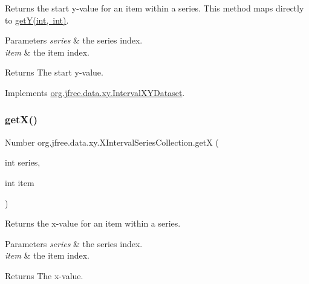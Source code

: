 Returns the start y-\/value for an item within a series. This method maps directly to \mbox{\hyperlink{classorg_1_1jfree_1_1data_1_1xy_1_1_x_interval_series_collection_ae156ad8d79e2278653592a74680ce835}{get\+Y(int, int)}}.


\begin{DoxyParams}{Parameters}
{\em series} & the series index. \\
\hline
{\em item} & the item index.\\
\hline
\end{DoxyParams}
\begin{DoxyReturn}{Returns}
The start y-\/value. 
\end{DoxyReturn}


Implements \mbox{\hyperlink{interfaceorg_1_1jfree_1_1data_1_1xy_1_1_interval_x_y_dataset_afdd414735adb233734bc35b76a005ed9}{org.\+jfree.\+data.\+xy.\+Interval\+X\+Y\+Dataset}}.

\mbox{\label{classorg_1_1jfree_1_1data_1_1xy_1_1_x_interval_series_collection_a2af637ee9454c9b23c9c61e6716eb01d}} 
\subsubsection{\texorpdfstring{get\+X()}{getX()}}
{\footnotesize\ttfamily Number org.\+jfree.\+data.\+xy.\+X\+Interval\+Series\+Collection.\+getX (\begin{DoxyParamCaption}\item[{int}]{series,  }\item[{int}]{item }\end{DoxyParamCaption})}

Returns the x-\/value for an item within a series.


\begin{DoxyParams}{Parameters}
{\em series} & the series index. \\
\hline
{\em item} & the item index.\\
\hline
\end{DoxyParams}
\begin{DoxyReturn}{Returns}
The x-\/value. 
\end{DoxyReturn}


